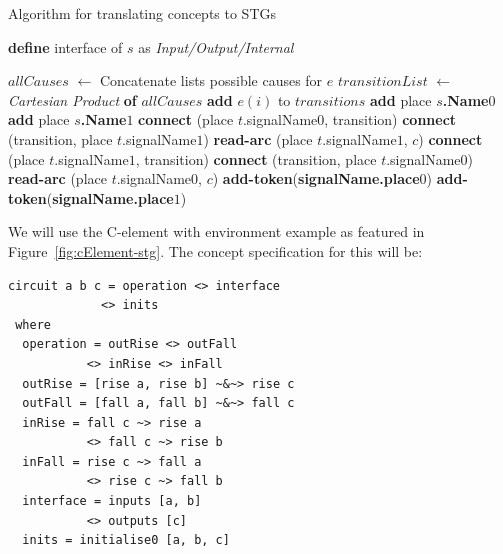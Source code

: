 \documentclass[british,conference,compsoc]{IEEEtran}
\begin{document}
\begin{algorithm}[t]
\begin{algorithmic}[1]
\caption{Algorithm for translating concepts to STGs\label{alg:translation}}
  \State \textbf{define} interface of $s$ as \emph{Input/Output/Internal}
\EndFor

  \State $allCauses$ $\leftarrow$ Concatenate lists  possible causes for $e$
  \State $transitionList$ $\leftarrow$ \emph{Cartesian Product} \textbf{of} 
	$allCauses$
    \State \textbf{add} $e(i)$ to $transitions$
  \EndFor 
\EndFor
{}
  \State \textbf{add} place \textbf{$s$.Name}$0$
  \State \textbf{add} place \textbf{$s$.Name}$1$
\EndFor
{}
    \State \textbf{connect} (place $t$.signalName$0$, transition)
    \State \textbf{connect} (transition, place $t$.signalName$1$)
      \State \textbf{read-arc} (place $t$.signalName$1$, $c$)
    \EndFor
  \EndIf
    \State \textbf{connect} (place $t$.signalName$1$, transition)
    \State \textbf{connect} (transition, place $t$.signalName$0$)
      \State \textbf{read-arc} (place $t$.signalName$0$, $c$)
    \EndFor
  \EndIf
\EndFor
{}
    \State \textbf{add-token}(\textbf{signalName.place}$0$)
  \EndIf 
    \State \textbf{add-token}(\textbf{signalName.place}$1$)
  \EndIf
\EndFor
\end{algorithmic}
\end{algorithm}

We will use the C-element with environment example as featured in Figure~\ref{fig:cElement-stg}.
The concept specification for this will be:

\begin{verbatim}
circuit a b c = operation <> interface 
             <> inits
 where
  operation = outRise <> outFall 
           <> inRise <> inFall
  outRise = [rise a, rise b] ~&~> rise c
  outFall = [fall a, fall b] ~&~> fall c
  inRise = fall c ~> rise a 
           <> fall c ~> rise b
  inFall = rise c ~> fall a 
           <> rise c ~> fall b
  interface = inputs [a, b] 
           <> outputs [c]
  inits = initialise0 [a, b, c]
\end{verbatim}
\end{document}

